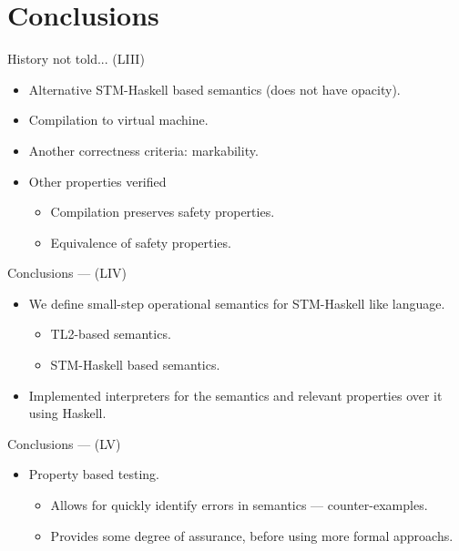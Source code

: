 \documentclass[14pt]{beamer}
\begin{document}
\section{Conclusions}
\begin{frame}{History not told... (LIII)}
   \begin{itemize}
      \item Alternative STM-Haskell based semantics (does not have opacity).
      \item Compilation to virtual machine.
      \item Another correctness criteria: markability.
      \item Other properties verified
      \begin{itemize}
         \item Compilation preserves safety properties.
         \item Equivalence of safety properties.
      \end{itemize}
   \end{itemize}
\end{frame}
\begin{frame}{Conclusions --- (LIV)}
   \begin{itemize}
      \item We define small-step operational semantics for STM-Haskell like language.
      \begin{itemize}
         \item TL2-based semantics.
         \item STM-Haskell based semantics.
      \end{itemize}
      \item Implemented interpreters for the semantics and relevant properties over it using Haskell.
   \end{itemize}
\end{frame}
\begin{frame}{Conclusions --- (LV)}
   \begin{itemize}
      \item Property based testing.
      \begin{itemize}
         \item Allows for quickly identify errors in semantics --- counter-examples.
         \item Provides some degree of assurance, before using more formal approachs.
      \end{itemize}
   \end{itemize}
\end{frame}
\end{document}

